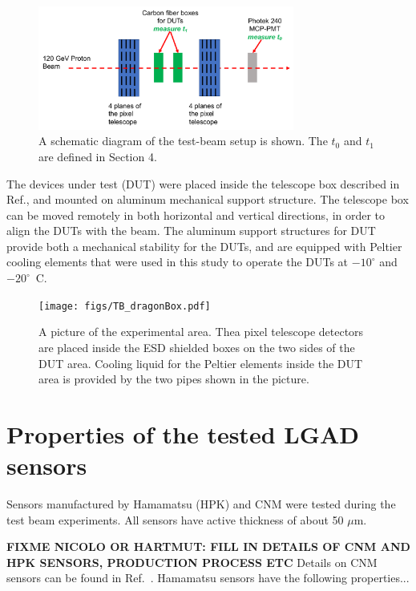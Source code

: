 \documentclass[preprint,1p]{elsarticle}
\begin{document}
\begin{figure}[htbp] 
\centering
\includegraphics[width=0.75\textwidth]{figs/BeamSetup.pdf} 
\caption{A schematic diagram of the test-beam setup is shown. The $t_0$ and $t_1$ are defined in Section 4.} 
\label{fig:DragonBoxDiagram} 
\end{figure} 

The devices under test (DUT) were placed inside the telescope box described in
Ref.\cite{KWAN2016162}, and mounted on aluminum mechanical support structure.
The telescope box can be moved remotely in both horizontal and vertical
directions, in order to align the DUTs with the beam. The aluminum support
structures for DUT provide both a mechanical stability for the DUTs, and are
equipped with Peltier cooling elements that were used in this study to operate
the DUTs at $-10^{\circ}$ and $-20^{\circ}$~C.

\begin{figure}[htbp] 
\centering
\texttt{[image: figs/TB\_dragonBox.pdf]} 
\caption{A picture of the experimental area. Thea pixel telescope detectors are placed inside the ESD shielded boxes on the two sides of the DUT area. Cooling liquid for the Peltier elements inside the DUT area is provided by the two pipes shown in the picture.} 
\label{fig:DragonBox} 
\end{figure} 


\section{Properties of the tested LGAD sensors}

Sensors manufactured by Hamamatsu (HPK) and CNM were tested during the test beam
experiments. All sensors have active thickness of about 50 $\mu$m. 

{\bf FIXME NICOLO OR HARTMUT: FILL IN DETAILS OF CNM AND HPK SENSORS, PRODUCTION
PROCESS ETC} Details on CNM sensors can be found in Ref.~\cite{CNMSensors,
Cartiglia201783}. Hamamatsu sensors have the following properties... 
\end{document}
